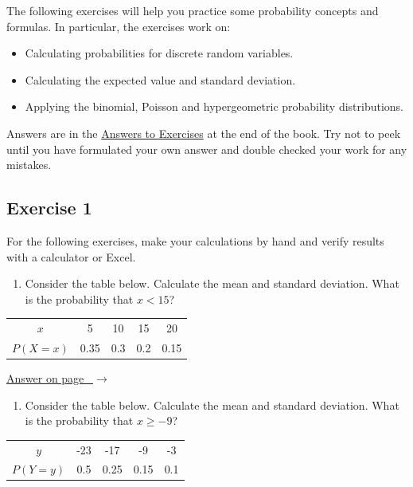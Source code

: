 \documentclass[
  11pt,
  letterpaper,
  DIV=11,
  numbers=noendperiod,
  oneside,
  open=any]{scrreprt}
\providecommand{\tightlist}{%
  \setlength{\itemsep}{0pt}\setlength{\parskip}{0pt}}\usepackage{longtable,booktabs,array}
\newcommand{\bsanswerref}[1]{%
  \par\nopagebreak\hypertarget{q-#1}{}\label{q-#1}%
  {\raggedleft\sffamily\footnotesize\hyperlink{a-#1}{\textcolor{bsaccent}{Answer on page \pageref{a-#1}\ $\rightarrow$}}\par}%
  \medskip}
\begin{document}
The following exercises will help you practice some probability concepts
and formulas. In particular, the exercises work on:

\begin{itemize}
\item
  Calculating probabilities for discrete random variables.
\item
  Calculating the expected value and standard deviation.
\item
  Applying the binomial, Poisson and hypergeometric probability
  distributions.
\end{itemize}

Answers are in the \hyperref[answers]{Answers to Exercises} at the end
of the book. Try not to peek until you have formulated your own answer
and double checked your work for any mistakes.

\subsection*{Exercise 1}\label{exercise-1-8}

For the following exercises, make your calculations by hand and verify
results with a calculator or Excel.

\begin{enumerate}
\def\labelenumi{\arabic{enumi}.}
\tightlist
\item
  Consider the table below. Calculate the mean and standard deviation.
  What is the probability that \(x<15\)?
\end{enumerate}

\begin{center}
\begin{tabular}{ccccc}
\toprule
\(x\) & 5 & 10 & 15 & 20 \\
\(P(X=x)\) & 0.35 & 0.3 & 0.2 & 0.15 \\
\bottomrule
\end{tabular}
\end{center}

\bsanswerref{bsans84}

\begin{enumerate}
\def\labelenumi{\arabic{enumi}.}
\setcounter{enumi}{1}
\tightlist
\item
  Consider the table below. Calculate the mean and standard deviation.
  What is the probability that \(x\geq-9\)?
\end{enumerate}

\begin{center}
\begin{tabular}{ccccc}
\toprule
\(y\) & -23 & -17 & -9 & -3 \\
\(P(Y=y)\) & 0.5 & 0.25 & 0.15 & 0.1 \\
\bottomrule
\end{tabular}
\end{center}
\end{document}
